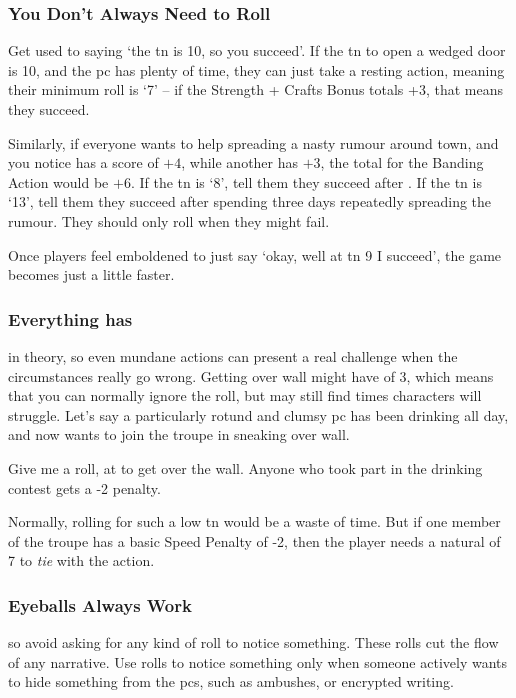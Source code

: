 \begin{multicols}{2}
\subsubsection{You Don't Always Need to Roll}

Get used to saying `the \gls{tn} is 10, so you succeed'.
If the \gls{tn} to open a wedged door is 10, and the \gls{pc} has plenty of time, they can just take a resting action, meaning their minimum roll is `7' -- if the Strength + Crafts Bonus totals +3, that means they succeed.

Similarly, if everyone wants to help spreading a nasty rumour around town, and you notice  has a  score of $+4$, while another has $+3$, the total for the Banding Action%
would be $+6$.
If the \gls{tn} is `8', tell them they succeed after .
If the \gls{tn} is `13', tell them they succeed after spending three days repeatedly spreading the rumour.
They should only roll when they might fail.

Once players feel emboldened to just say `okay, well at \gls{tn} 9 I succeed', the game becomes just a little faster.

\subsubsection{Everything has }
in theory, so even mundane actions can present a real challenge when the circumstances really go wrong.
Getting over  wall might have  of 3, which means that you can normally ignore the roll, but may still find times characters will struggle.
Let's say a particularly rotund and clumsy \gls{pc} has been drinking all day, and now wants to join the troupe in sneaking over  wall.

\begin{speechtext}
  Give me a  roll, at \tn[3] to get over the wall.
  Anyone who took part in the drinking contest gets a -2 penalty.
\end{speechtext}

Normally, rolling for such a low \gls{tn} would be a waste of time.
But if one member of the troupe has a basic Speed Penalty of -2, then the player needs a \gls{natural} of 7 to \emph{tie} with the action.

\subsubsection{Eyeballs Always Work}
so avoid asking for any kind of roll to notice something.
These rolls cut the flow of any narrative.
Use rolls to notice something only when someone actively wants to hide something from the \glspl{pc}, such as ambushes, or encrypted writing.


\end{multicols}
